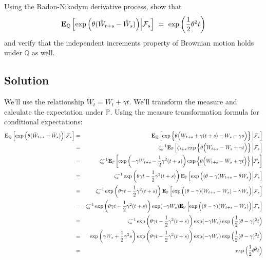 \documentclass[uplatex,a4j,12pt,dvipdfmx]{jsarticle}
\begin{document}
Using the Radon-Nikodym derivative process, show that
$$
	{\bf E}_{\mathbb{Q}}
	\left[ \exp \Big( \theta (\tilde{W}_{t+s} - \tilde{W}_{s}) \Big) \Big| \mathcal{F}_{s} \right]
	\ = \
	\exp \left( \dfrac{1}{2} \theta^{2} t \right)
$$
and verify that the independent increments property of Brownian motion holds under $\mathbb{Q}$ as well.
\subsection{Solution}

We'll use the relationship $\tilde{W}_{t} = W_{t} + \gamma t$.
We'll transform the measure and calculate the expectation under $\mathbb{P}$.
Using the measure transformation formula for conditional expectations:
%
\begin{eqnarray*}
	{\bf E}_{\mathbb{Q}}
	\left[ \exp \Big( \theta (\tilde{W}_{t+s} - \tilde{W}_{s}) \Big) \Big| \mathcal{F}_{s} \right]
	&=&
	{\bf E}_{\mathbb{Q}}
	\left[ \exp
		\left\{
		\theta \Big( W_{t+s} + \gamma (t+s) - W_{s} - \gamma s \Big)
		\right\}
		\Big| \mathcal{F}_{s} \right]
	\\ &=&
	\zeta_{s}^{-1}
	{\bf E}_{\mathbb{P}}
	\left[ \zeta_{t+s} \exp \left\{ \theta \Big( W_{t+s} - W_{s} + \gamma t \Big) \right\} \Big| \mathcal{F}_{s} \right]
	\\ &=&
	\zeta_{s}^{-1}
	{\bf E}_{\mathbb{P}}
	\left[ \exp \left( - \gamma W_{t+s} - \dfrac{1}{2} \gamma^{2} (t+s) \right) \exp \left\{ \theta \Big( W_{t+s} - W_{s} + \gamma t \Big) \right\} \Big| \mathcal{F}_{s} \right]
	\\ &=&
	\zeta_{s}^{-1}
	\exp \left( \theta \gamma t - \dfrac{1}{2} \gamma^{2} (t+s) \right)
	{\bf E}_{\mathbb{P}}
	\left[ \exp \Big( ( \theta - \gamma ) W_{t+s} - \theta W_{s} \Big) \Big| \mathcal{F}_{s} \right]
	\\ &=&
	\zeta_{s}^{-1}
	\exp \left( \theta \gamma t - \dfrac{1}{2} \gamma^{2} (t+s) \right)
	{\bf E}_{\mathbb{P}}
	\left[ \exp \Big( ( \theta - \gamma ) ( W_{t+s} - W_{s} ) - \gamma W_{s} \Big) \Big| \mathcal{F}_{s} \right]
	\\ &=&
	\zeta_{s}^{-1}
	\exp \left( \theta \gamma t - \dfrac{1}{2} \gamma^{2} (t+s) \right)
	\exp ( - \gamma W_{s} )
	{\bf E}_{\mathbb{P}}
	\left[ \exp \Big( ( \theta - \gamma ) ( W_{t+s} - W_{s} ) \Big) \Big| \mathcal{F}_{s} \right]
	\\ &=&
	\zeta_{s}^{-1}
	\exp \left( \theta \gamma t - \dfrac{1}{2} \gamma^{2} (t+s) \right)
	\exp ( - \gamma W_{s} )
	\exp \Big( \dfrac{1}{2} (\theta - \gamma)^{2} t \Big)
	\\ &=&
	\exp \left( \gamma W_{s} + \dfrac{1}{2} \gamma^{2} s \right)
	\exp \left( \theta \gamma t - \dfrac{1}{2} \gamma^{2} (t+s) \right)
	\exp ( - \gamma W_{s} )
	\exp \Big( \dfrac{1}{2} (\theta - \gamma)^{2} t \Big)
	\\ &=&
	\exp \Big( \dfrac{1}{2} \theta^{2} t \Big)
\end{eqnarray*}
%
\end{document}
